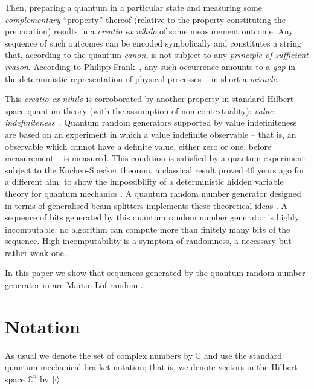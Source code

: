 \documentclass[%
 preprint,
 showpacs,
 showkeys,
 preprintnumbers,
  amsmath,amssymb,
  aps,
 pra,
  longbibliography,
  floatfix,
 ]{revtex4-1}
\theoremstyle{plain}
\begin{document}
Then, preparing a quantum in a particular state and measuring some {\em complementary} ``property'' thereof
(relative to the property constituting the preparation)
results in a {\em creatio ex nihilo} of some measurement outcome.
Any sequence of such outcomes can be encoded symbolically and constitutes a
string that, according to the quantum {\it canon}, is not subject to any {\em principle of sufficient reason}.
According to Philipp Frank~\cite{frank},
any such occurrence amounts to a {\em gap} in the deterministic representation of physical processes -- in short a {\em miracle}.

This {\em creatio ex nihilo} is corroborated by another property in standard Hilbert space quantum theory
(with the assumption of non-contextuality): {\em value indefiniteness}~\cite{pitowsky:218}.
Quantum random generators supported by value indefiniteness are based on an experiment
in which a value indefinite observable -- that is, an observable which cannot have a definite value,
either zero or one, before measurement -- is measured.
This condition is satisfied by a quantum experiment subject to the Kochen-Specker theorem,
a classical result proved 46 years ago for a different aim:
to show the impossibility of a deterministic hidden variable theory for quantum mechanics \cite{KS}.
A quantum random number generator  designed in terms of generalised beam splitters
implements these theoretical ideas \cite{ACCS}.
A sequence of bits generated by this quantum random number generator is highly incomputable:
no algorithm can compute more than finitely many bits of the sequence.
High incomputability is a symptom of randomness, a necessary but rather weak one.

In this paper  we show that sequences generated by the quantum random number generator in \cite{ACCS} are Martin-L\"of random...



\section{Notation}
\label{sec:notation}

 As usual we denote the set of complex numbers by $\mathbb{C}$
and use the standard quantum mechanical bra-ket notation;
that is, we denote vectors in the Hilbert space $\mathbb{C}^n$ by $\ket{\cdot}$.
\end{document}
